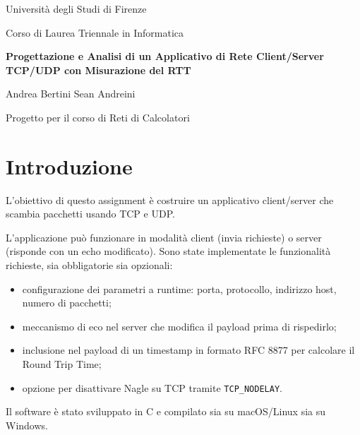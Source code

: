 \documentclass[12pt,a4paper,oneside]{article}
\begin{document}
\begin{titlepage}
    \centering
    {\large Università degli Studi di Firenze\par}
    {\small Corso di Laurea Triennale in Informatica\par}
    \vspace{1cm}
    {\LARGE\bfseries Progettazione e Analisi di un Applicativo di Rete Client/Server TCP/UDP con Misurazione del RTT\par}
    \vspace{1.5cm}
    {\large Andrea Bertini \quad\textbullet\quad Sean Andreini\par}
    \vspace{2cm}
    {\small Progetto per il corso di Reti di Calcolatori\par}
\end{titlepage}

\newpage
\tableofcontents
\newpage

\section{Introduzione}
L'obiettivo di questo assignment è costruire un applicativo client/server che scambia pacchetti usando TCP e UDP.

L'applicazione può funzionare in modalità client (invia richieste) o server (risponde con un echo modificato). Sono state implementate le funzionalità richieste, sia obbligatorie sia opzionali:
\begin{itemize}
    \item configurazione dei parametri a runtime: porta, protocollo, indirizzo host, numero di pacchetti;
    \item meccanismo di eco nel server che modifica il payload prima di rispedirlo;
    \item inclusione nel payload di un timestamp in formato RFC 8877 per calcolare il Round Trip Time;
    \item opzione per disattivare Nagle su TCP tramite \texttt{TCP\_NODELAY}.
\end{itemize}

Il software è stato sviluppato in C e compilato sia su macOS/Linux sia su Windows.

\end{document}
